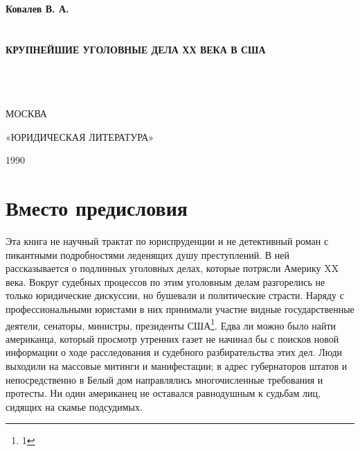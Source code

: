 \documentclass[12pt, a4paper, openany]{book}
\begin{document}
	
	\begin{titlepage}
		
		\begin{center}
			\vspace*{\fill}
			
			
			{\large\bf Ковалев В. А.\\}
			\ \\
			\ \\
			{\Huge\bf КРУПНЕЙШИЕ УГОЛОВНЫЕ ДЕЛА ХХ ВЕКА В США\\}
			\ \\
			\ \\
			\ \\
			\vspace*{\fill}
			
			\vfill
			
			
			МОСКВА
			
			«ЮРИДИЧЕСКАЯ ЛИТЕРАТУРА»
			
			1990
			

		\end{center}
		
	\end{titlepage}
	
	\thispagestyle{empty} %
	
	\newpage
	

\setcounter{secnumdepth}{0}
	
	\section[Вместо предисловия]{\center \textbf{Вместо предисловия}}
	
Эта книга не научный трактат по юриспруденции и не детективный роман с пикантными подробностями леденящих душу преступлений. В ней рассказывается о  подлинных уголовных делах, которые потрясли Америку XX века. Вокруг судебных процессов по этим уголовным делам разгорелись не только юридические дискуссии, но  бушевали и политические страсти. Наряду с профессиональными юристами в них принимали участие видные  государственные деятели, сенаторы, министры, президенты США{\footnote{1}}. Едва ли можно было найти американца, который просмотр утренних газет не начинал бы с поисков новой информации о ходе расследования и судебного разбирательства этих дел. Люди выходили на массовые митинги и манифестации; в адрес губернаторов штатов и непосредственно в Белый дом направлялись многочисленные требования и протесты. Ни один американец не оставался равнодушным к судьбам лиц, сидящих на скамье подсудимых. 
\end{document}
